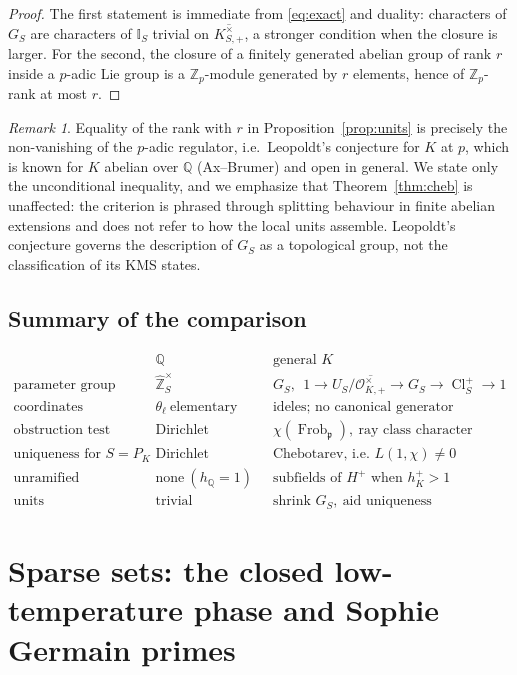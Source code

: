 \documentclass[11pt]{amsart}
\numberwithin{equation}{section}
\theoremstyle{definition}
\theoremstyle{remark}
\newtheorem{remark}[theorem]{Remark}
\newcommand{\Z}{\mathbb{Z}}
\newcommand{\Q}{\mathbb{Q}}
\newcommand{\hZ}{\widehat{\Z}}
\newcommand{\Cl}{\operatorname{Cl}}
\newcommand{\Frob}{\operatorname{Frob}}
\newcommand{\cO}{\mathcal{O}}
\newcommand{\Idl}{\mathbb{I}}
\newcommand{\pp}{\mathfrak{p}}
\begin{document}
\begin{proof}
The first statement is immediate from \eqref{eq:exact} and duality: characters
of $G_S$ are characters of $\Idl_S$ trivial on $\overline{K^\times_{S,+}}$, a
stronger condition when the closure is larger. For the second, the closure of a
finitely generated abelian group of rank $r$ inside a $p$-adic Lie group is a
$\Z_p$-module generated by $r$ elements, hence of $\Z_p$-rank at most $r$.
\end{proof}

\begin{remark}\label{rem:leopoldt}
Equality of the rank with $r$ in Proposition~\ref{prop:units} is precisely the
non-vanishing of the $p$-adic regulator, i.e.\ Leopoldt's conjecture for $K$ at
$p$, which is known for $K$ abelian over $\Q$ (Ax--Brumer) and open in general.
We state only the unconditional inequality, and we emphasize that
Theorem~\ref{thm:cheb} is unaffected: the criterion is phrased through
splitting behaviour in finite abelian extensions and does not refer to how the
local units assemble. Leopoldt's conjecture governs the description of $G_S$ as
a topological group, not the classification of its KMS states.
\end{remark}

\subsection{Summary of the comparison}

\[
\begin{array}{lll}
& \Q & \text{general }K\\\hline
\text{parameter group} & \hZ_S^\times & G_S,\ \ 1\to U_S/\overline{\cO^\times_{K,+}}\to G_S\to\Cl^+_S\to1\\
\text{coordinates} & \theta_\ell\ \text{elementary} & \text{ideles; no canonical generator}\\
\text{obstruction test} & \text{Dirichlet character} & \chi(\Frob_\pp),\ \text{ray class character}\\
\text{uniqueness for }S=P_K & \text{Dirichlet} & \text{Chebotarev, i.e.\ }L(1,\chi)\neq0\\
\text{unramified obstructions} & \text{none}\ (h_\Q=1) & \text{subfields of }H^+\text{ when }h^+_K>1\\
\text{units} & \text{trivial} & \text{shrink }G_S,\ \text{aid uniqueness}
\end{array}
\]
\section{Sparse sets: the closed low-temperature phase and Sophie Germain primes}\label{sec:sparse}
\end{document}
